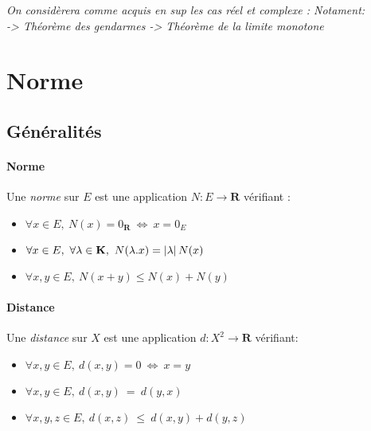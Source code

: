 

\textit{\small On considèrera comme acquis en sup les cas réel et complexe : Notament:\\ -> Théorème des gendarmes \hfill -> Théorème de la limite monotone} \hfill ${}$

\minitoc

\section{Norme}

	\subsection{Généralités}
	
		\vspace{-15pt}
		\traitd
		\paragraph{Norme} Une \emph{norme} sur $E$ est une application $N: E \rightarrow\mathbf{R}$ vérifiant : 
			\begin{itemize}
				\item $\forall x\in E, ~N(x) = 0_{\mathbf{R}} ~\Leftrightarrow ~x=0_E$
				\item $\forall x\in E, ~\forall \lambda \in \mathbf{K} , ~N(\lambda .x) = \left\vert \lambda \right\vert N(x)$
				\item $ \forall x,y \in E, ~N(x+y) \leq N(x)+N(y)$ 
			\end{itemize}
		\trait 
		
			
		\traitd
		\paragraph{Distance} Une \emph{distance} sur $X$ est une application $d:X^2\rightarrow\mathbf{R}$ vérifiant:
			\begin{itemize}
				\item $\forall x,y\in E, ~d(x,y) = 0 ~\Leftrightarrow ~x=y$
				\item $\forall x,y\in E, ~d(x,y)~=~d(y,x)$
				\item $\forall x,y,z\in E, ~d(x,z)~\leq~d(x,y)+d(y,z)$
			\end{itemize}
		\trait
		
